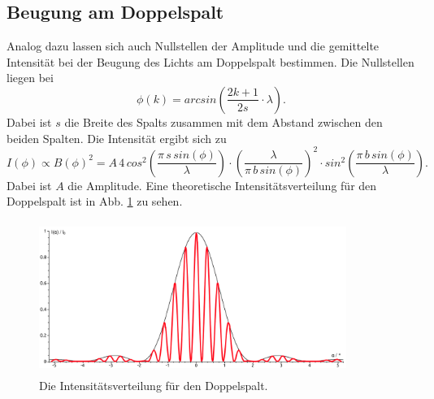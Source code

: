 \subsection{Beugung am Doppelspalt}
Analog dazu lassen sich auch Nullstellen der Amplitude und 
die gemittelte Intensität bei der Beugung des Lichts am 
Doppelspalt bestimmen.
Die Nullstellen liegen bei 
\begin{equation*}
    \phi(k) = arcsin \left(\frac{2k+1}{2s}\cdot \lambda \right).
\end{equation*}
Dabei ist $s$ die Breite des Spalts zusammen mit
dem Abstand zwischen den beiden Spalten.
\newline
Die Intensität ergibt sich zu 
\begin{equation}
    I(\phi) \propto B(\phi)^2 = A \, 4 \, cos^2 \left(\frac{\pi \, s \, sin(\phi)}{\lambda} \right)\cdot \left(\frac{\lambda}{\pi \, b \, sin(\phi)} \right)^2 \cdot sin^2 \left(\frac{\pi \, b \, sin(\phi)}{\lambda}\right).
    \label{eqn:doppelspalt}
\end{equation}
Dabei ist $A$ die Amplitude.
Eine theoretische Intensitätsverteilung für den Doppelspalt
ist in Abb. \ref{fig:doppel} zu sehen.
\begin{figure}
    \centering
    \includegraphics[width=10cm, height=5cm]{build/Doppelspalt.png}
    \caption{Die Intensitätsverteilung für den Doppelspalt. \cite{doppel}}
    \label{fig:doppel}
\end{figure}
